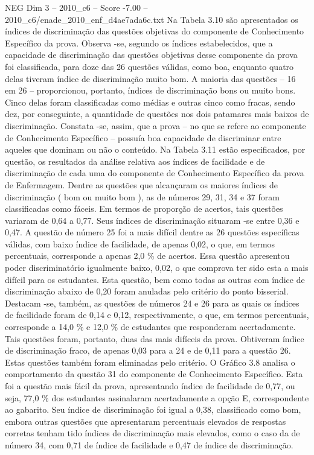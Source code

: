 \begin{textsample}{NEG Dim 3 – 2010\_c6 – Score -7.00 – 2010\_c6/enade\_2010\_enf\_d4ae7ada6c.txt}
Na Tabela 3.10 são apresentados os índices de discriminação das questões objetivas do componente de Conhecimento Específico da prova.
Observa -se, segundo os índices estabelecidos, que a capacidade de discriminação das questões objetivas desse componente da prova foi classificada, para doze das 26 questões válidas, como boa, enquanto quatro delas tiveram índice de discriminação muito bom.
A maioria das questões – 16 em 26 – proporcionou, portanto, índices de discriminação bons ou muito bons.
Cinco delas foram classificadas como médias e outras cinco como fracas, sendo dez, por conseguinte, a quantidade de questões nos dois patamares mais baixos de discriminação.
Constata -se, assim, que a prova – no que se refere ao componente de Conhecimento Específico – possuía boa capacidade de discriminar entre aqueles que dominam ou não o conteúdo.
Na Tabela 3.11 estão especificados, por questão, os resultados da análise relativa aos índices de facilidade e de discriminação de cada uma do componente de Conhecimento Específico da prova de Enfermagem.
Dentre as questões que alcançaram os maiores índices de discriminação ( bom ou muito bom ), as de números 29, 31, 34 e 37 foram classificadas como fáceis.
Em termos de proporção de acertos, tais questões variaram de 0,64 a 0,77.
Seus índices de discriminação situaram -se entre 0,36 e 0,47.
A questão de número 25 foi a mais difícil dentre as 26 questões específicas válidas, com baixo índice de facilidade, de apenas 0,02, o que, em termos percentuais, corresponde a apenas 2,0 \% de acertos.
Essa questão apresentou poder discriminatório igualmente baixo, 0,02, o que comprova ter sido esta a mais difícil para os estudantes.
Esta questão, bem como todas as outras com índice de discriminação abaixo de 0,20 foram anuladas pelo critério do ponto bisserial.
Destacam -se, também, as questões de números 24 e 26 para as quais os índices de facilidade foram de 0,14 e 0,12, respectivamente, o que, em termos percentuais, corresponde a 14,0 \% e 12,0 \% de estudantes que responderam acertadamente.
Tais questões foram, portanto, duas das mais difíceis da prova.
Obtiveram índice de discriminação fraco, de apenas 0,03 para a 24 e de 0,11 para a questão 26.
Estas questões também foram eliminadas pelo critério.
O Gráfico 3.8 analisa o comportamento da questão 31 do componente de Conhecimento Específico.
Esta foi a questão mais fácil da prova, apresentando índice de facilidade de 0,77, ou seja, 77,0 \% dos estudantes assinalaram acertadamente a opção E, correspondente ao gabarito.
Seu índice de discriminação foi igual a 0,38, classificado como bom, embora outras questões que apresentaram percentuais elevados de respostas corretas tenham tido índices de discriminação mais elevados, como o caso da de número 34, com 0,71 de índice de facilidade e 0,47 de índice de discriminação.

\end{textsample}
